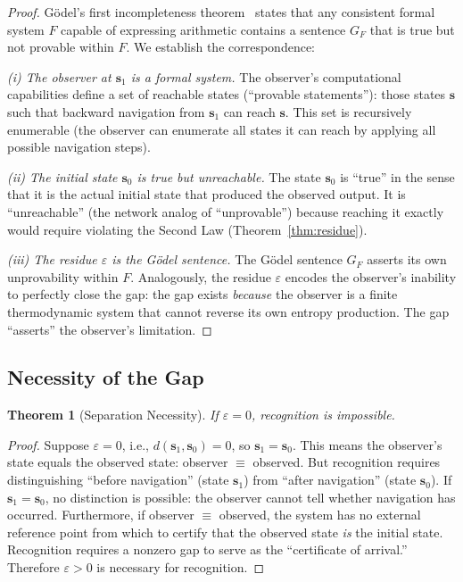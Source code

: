 \documentclass[11pt,twocolumn,a4paper]{article}
\newtheorem{theorem}{Theorem}[section]
\theoremstyle{definition}
\newcommand{\eps}{\varepsilon}
\begin{document}
\begin{proof}
G\"odel's first incompleteness theorem~\cite{godel1931} states that any consistent formal
system $F$ capable of expressing arithmetic contains a sentence $G_F$ that is true but
not provable within $F$. We establish the correspondence:

\emph{(i) The observer at $\mathbf{s}_1$ is a formal system.}
The observer's computational capabilities define a set of reachable states (``provable
statements''): those states $\mathbf{s}$ such that backward navigation from
$\mathbf{s}_1$ can reach $\mathbf{s}$. This set is recursively enumerable (the observer
can enumerate all states it can reach by applying all possible navigation steps).

\emph{(ii) The initial state $\mathbf{s}_0$ is true but unreachable.}
The state $\mathbf{s}_0$ is ``true'' in the sense that it is the actual initial state
that produced the observed output. It is ``unreachable'' (the network analog of
``unprovable'') because reaching it exactly would require violating the Second Law
(Theorem~\ref{thm:residue}).

\emph{(iii) The residue $\eps$ is the G\"odel sentence.}
The G\"odel sentence $G_F$ asserts its own unprovability within $F$. Analogously, the
residue $\eps$ encodes the observer's inability to perfectly close the gap: the gap
exists \emph{because} the observer is a finite thermodynamic system that cannot reverse
its own entropy production. The gap ``asserts'' the observer's limitation.
\end{proof}

\subsection{Necessity of the Gap}\label{sec:godelian:necessity}

\begin{theorem}[Separation Necessity]\label{thm:separation}
If $\eps = 0$, recognition is impossible.
\end{theorem}

\begin{proof}
Suppose $\eps = 0$, i.e., $d(\mathbf{s}_1, \mathbf{s}_0) = 0$, so $\mathbf{s}_1 = \mathbf{s}_0$.
This means the observer's state equals the observed state: observer $\equiv$ observed.
But recognition requires distinguishing ``before navigation'' (state $\mathbf{s}_1$) from
``after navigation'' (state $\mathbf{s}_0$). If $\mathbf{s}_1 = \mathbf{s}_0$, no
distinction is possible: the observer cannot tell whether navigation has occurred.
Furthermore, if observer $\equiv$ observed, the system has no external reference point
from which to certify that the observed state \emph{is} the initial state. Recognition
requires a nonzero gap to serve as the ``certificate of arrival.'' Therefore $\eps > 0$
is necessary for recognition.
\end{proof}
\end{document}
